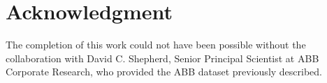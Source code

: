 \documentclass[conference]{IEEEtran}
\begin{document}
\section*{Acknowledgment}
The completion of this work could not have been possible without the collaboration with David C. Shepherd, Senior Principal Scientist at ABB Corporate Research, who provided the ABB dataset previously described.







\end{document}
